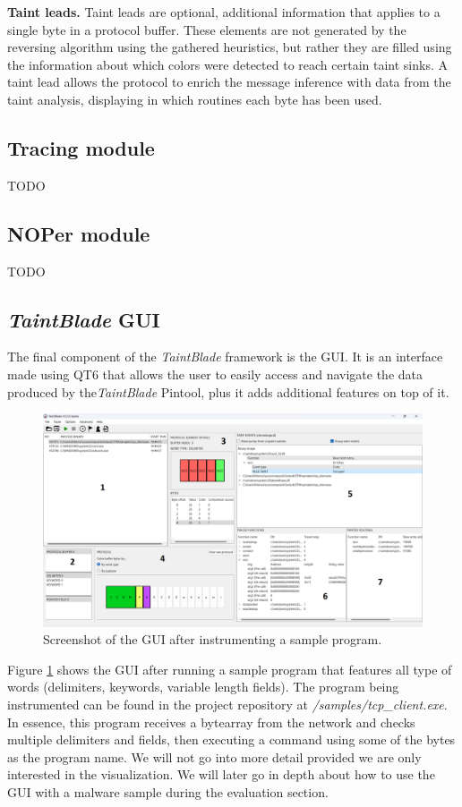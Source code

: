 \documentclass[conference]{IEEEtran}
\begin{document}
\textbf{Taint leads.} Taint leads are optional, additional information that applies to a single byte in a protocol buffer.
These elements are not generated by the reversing algorithm using the gathered heuristics, but rather
they are filled using the information about which colors were detected to reach certain taint sinks.
A taint lead allows the protocol to enrich the message inference with data from the taint analysis,
displaying in which routines each byte has been used.


\subsection{Tracing module}
TODO

\subsection{NOPer module}
TODO

\subsection{\textit{TaintBlade} GUI}
The final component of the \textit{TaintBlade} framework is the GUI. It is 
an interface made using QT6 that allows the user to easily access and navigate 
the data produced by the\textit{TaintBlade} Pintool, plus it adds additional 
features on top of it.

\begin{figure}
    \centerline{\includegraphics[width=\textwidth]{images/GUI_full.png}}
    \caption{Screenshot of the GUI after instrumenting a sample program.}
    \label{figure:gui_full}
\end{figure}

Figure \ref{figure:gui_full} shows the GUI after running a sample program that features all type
of words (delimiters, keywords, variable length fields). The program being instrumented can be found in the project
repository at \textit{/samples/tcp\_client.exe}. In essence, this program receives a bytearray
from the network and checks multiple delimiters and fields, then executing a command using
some of the bytes as the program name. We will not go into more detail provided we are only
interested in the visualization. We will later go in depth about how to use the GUI with a
malware sample during the evaluation section.
\end{document}
